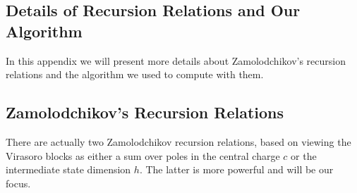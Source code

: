 \begin{subappendices}
\section{Details of Recursion Relations and Our Algorithm}
\label{app:ZRecursion}
In this appendix we will present more details about Zamolodchikov's recursion relations and the algorithm we used to compute with them.

\subsection{Zamolodchikov's Recursion Relations}

There are actually two Zamolodchikov recursion relations, based on viewing the Virasoro blocks as either a sum over poles in the central charge $c$ or the intermediate state dimension $h$.  The latter is more powerful and will be our focus. 


\end{subappendices}
